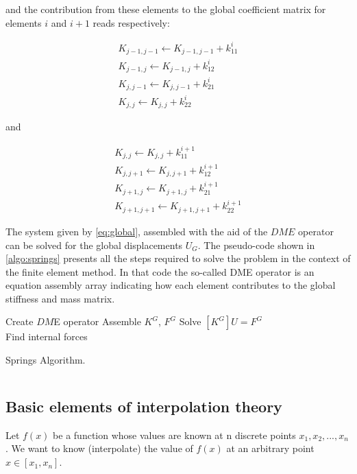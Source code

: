 and the contribution from these elements to the global coefficient matrix for elements $i$ and $i+1$ reads respectively:


\[\begin{array}{l}
{K_{j - 1,j - 1}} \leftarrow {K_{j - 1,j - 1}} + k_{11}^i\\
{K_{j - 1,j}} \leftarrow {K_{j - 1,j}} + k_{12}^i\\
{K_{j,j - 1}} \leftarrow {K_{j,j - 1}} + k_{21}^i\\
{K_{j,j}} \leftarrow {K_{j,j}} + k_{22}^i
\end{array}\]

and

\[\begin{array}{l}
{K_{j,j}} \leftarrow {K_{j,j}} + k_{11}^{i + 1}\\
{K_{j,j + 1}} \leftarrow {K_{j,j + 1}} + k_{12}^{i + 1}\\
{K_{j + 1,j}} \leftarrow {K_{j + 1,j}} + k_{21}^{i + 1}\\
{K_{j + 1,j + 1}} \leftarrow {K_{j + 1,j + 1}} + k_{22}^{i + 1}
\end{array}\]

The system given by \cref{eq:global}, assembled with the aid of the $DME$ operator can be solved for the global displacements $U_G$. The pseudo-code shown in \cref{algo:springs} presents all the steps required to solve the problem in the context of the finite element method. In that code the so-called DME operator is an equation assembly array indicating how each element contributes to the global stiffness and mass matrix.

\begin{algorithm}[H]\label{algo:springs}
    \SetAlgoLined
    Create $DM$E operator\;
    Assemble $K^G$, $F^G$\;
    Solve $[K^G]U=F^G$\\
    Find internal forces
    \caption{Springs Algorithm.}    
\end{algorithm}

\newpage

\inputminted[]{python}{src/engine.py}

\newpage


\subsection{Basic elements of interpolation theory}
Let $f(x)$ be a function whose values are known at n discrete points ${x_1, x_2,...,x_n}$. We want to know (interpolate) the value of $f(x)$ at an arbitrary point $x \in \left[ {{x_1},{x_n}} \right]$.

